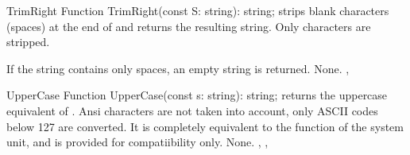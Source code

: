 

\begin{function}{TrimRight}
\Declaration
Function TrimRight(const S: string): string;
\Description
{} strips blank characters (spaces) at the end of 
and returns the resulting string. Only  characters are stripped.

If the string contains only spaces, an empty string is returned.
\Errors
None.
\SeeAlso
{}, 
\end{function}




\begin{function}{UpperCase}
\Declaration
Function UpperCase(const s: string): string;
\Description
{} returns the uppercase equivalent of . Ansi characters
are not taken into account, only ASCII codes below 127 are converted. It is
completely equivalent to the  function of the system unit, and is
provided for compatiibility only.
\Errors
None.
\SeeAlso
{}, , 
\Errors
\SeeAlso
\end{function}



